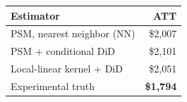 \begin{tabular}{lr}
\toprule
\textbf{Estimator} & \textbf{ATT} \\
\midrule
PSM, nearest neighbor (NN)        & \$2,007 \\
PSM + conditional DiD             & \$2,101 \\
Local-linear kernel + DiD         & \$2,051 \\
\midrule
Experimental truth                & \textcolor{rmgold}{\textbf{\$1,794}} \\
\bottomrule
\end{tabular}
